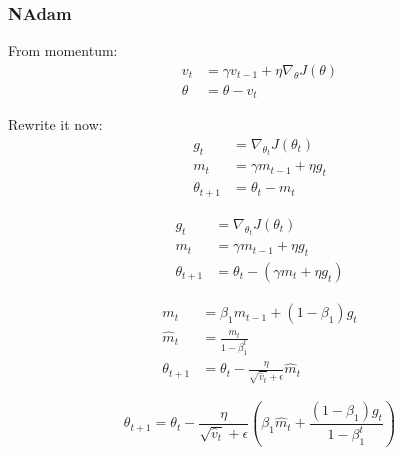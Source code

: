 \documentclass{beamer}
\begin{document}
\begin{frame}
    \frametitle{NAdam}
    
    From momentum:
    \begin{equation}
        \begin{aligned} v _ { t } & = \gamma v _ { t - 1 } + \eta \nabla _ { \theta } J ( \theta ) \\ \theta & = \theta - v _ { t } \end{aligned}
    \end{equation}
    
    Rewrite it now:
    \begin{equation}
        \begin{aligned} g _ { t } & = \nabla _ { \theta _ { t } } J \left( \theta _ { t } \right) \\ m _ { t } & = \gamma m _ { t - 1 } + \eta g _ { t } \\ \theta _ { t + 1 } & = \theta _ { t } - m _ { t } \end{aligned}
    \end{equation}
    
    \begin{equation}
        \begin{aligned} g _ { t } & = \nabla _ { \theta _ { t } } J \left( \theta _ { t } \right) \\ m _ { t } & = \gamma m _ { t - 1 } + \eta g _ { t } \\ \theta _ { t + 1 } & = \theta _ { t } - \left( \gamma m _ { t } + \eta g _ { t } \right) \end{aligned}
    \end{equation}
    
   

\end{frame}

\begin{frame}

 \begin{equation}
        \begin{aligned} m _ { t } & = \beta _ { 1 } m _ { t - 1 } + \left( 1 - \beta _ { 1 } \right) g _ { t } \\ \hat { m } _ { t } & = \frac { m _ { t } } { 1 - \beta _ { 1 } ^ { t } } \\ \theta _ { t + 1 } & = \theta _ { t } - \frac { \eta } { \sqrt { \hat { v } _ { t } } + \epsilon } \hat { m } _ { t } \end{aligned}
    \end{equation}
    
    \begin{equation}
        \theta _ { t + 1 } = \theta _ { t } - \frac { \eta } { \sqrt { \hat { v } _ { t } } + \epsilon } \left( \beta _ { 1 } \hat { m } _ { t } + \frac { \left( 1 - \beta _ { 1 } \right) g _ { t } } { 1 - \beta _ { 1 } ^ { t } } \right)
    \end{equation}
\end{frame}
\end{document}
